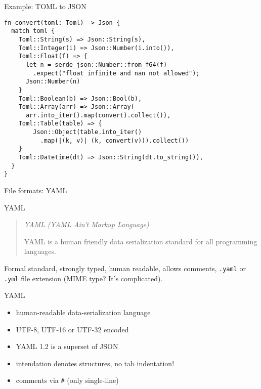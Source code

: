 \documentclass{beamer}
\begin{document}
\begin{frame}[fragile]{Example: TOML to JSON}
  \begin{verbatim}
fn convert(toml: Toml) -> Json {
  match toml {
    Toml::String(s) => Json::String(s),
    Toml::Integer(i) => Json::Number(i.into()),
    Toml::Float(f) => {
      let n = serde_json::Number::from_f64(f)
        .expect("float infinite and nan not allowed");
      Json::Number(n)
    }
    Toml::Boolean(b) => Json::Bool(b),
    Toml::Array(arr) => Json::Array(
      arr.into_iter().map(convert).collect()),
    Toml::Table(table) => {
        Json::Object(table.into_iter()
          .map(|(k, v)| (k, convert(v))).collect())
    }
    Toml::Datetime(dt) => Json::String(dt.to_string()),
  }
}
  \end{verbatim}
\end{frame}

\begin{frame}[standout]
  File formats: YAML
\end{frame}

\begin{frame}[fragile]{YAML}
  \begin{quote}
    \emph{YAML (YAML Ain't Markup Language)}

    YAML is a human friendly data serialization standard for all programming languages.
  \end{quote}

  Formal standard, strongly typed, human readable, allows comments, \texttt{.yaml} or \texttt{.yml} file extension (MIME type? It's complicated).
\end{frame}

\begin{frame}[fragile]{YAML}
  \begin{itemize}
    \item human-readable data-serialization language
    \item UTF-8, UTF-16 or UTF-32 encoded
    \item YAML 1.2 is a superset of JSON
    \item intendation denotes structures, no tab indentation!
    \item comments via \texttt{#} (only single-line)
  \end{itemize}
\end{frame}
\end{document}
